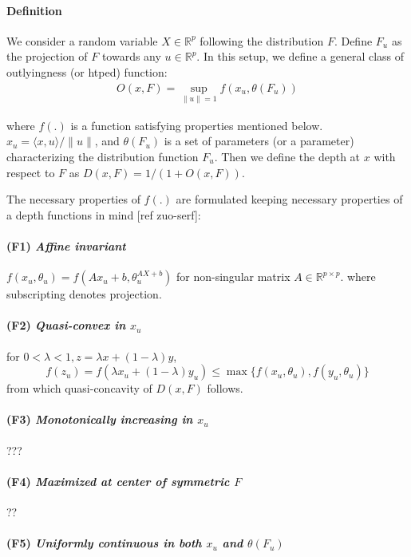 \documentclass{article}
\begin{document}
\paragraph{Definition}
We consider a random variable $X\in\mathbb{R}^p$ following the distribution $F$. Define $F_u$ as the projection of $F$ towards any $u\in\mathbb{R}^p$. In this setup, we define a general class of outlyingness (or htped) function:
\begin{eqnarray}
O(x,F) = \sup_{\|u\|=1} f(x_u,\theta(F_u))
\end{eqnarray}

where $f(.)$ is a function satisfying properties mentioned below. $x_u=\langle x,u\rangle/\|u\| $, and $\theta(F_u)$ is a set of parameters (or a parameter) characterizing the distribution function $F_u$. Then we define the depth at $x$ with respect to $F$ as $ D(x,F) = 1/(1+O(x,F)) $.

The necessary properties of $f(.)$ are formulated keeping necessary properties of a depth functions in mind [ref zuo-serf]:
\paragraph{(F1) \textit{Affine invariant}} $f(x_u,\theta_u) = f(Ax_u+b,\theta^{AX+b}_u)$ for non-singular matrix $A\in\mathbb{R}^{p\times p}$.
where subscripting denotes projection.

\paragraph{(F2) \textit{Quasi-convex in $x_u$}} for $0<\lambda<1, z=\lambda x+(1-\lambda)y$,
$$ f(z_u) = f(\lambda x_u+(1-\lambda)y_u) \leq \max\lbrace f(x_u,\theta_u), f(y_u,\theta_u)\rbrace$$
from which quasi-concavity of $D(x,F)$ follows.

\paragraph{(F3) \textit{Monotonically increasing in $x_u$}} ???

\paragraph{(F4) \textit{Maximized at center of symmetric $F$}} ??

\paragraph{(F5) \textit{Uniformly continuous in both $x_u$ and $\theta(F_u)$}}
\end{document}
